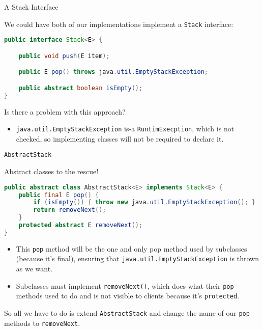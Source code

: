 \documentclass{beamer}
\begin{document}
\begin{frame}[fragile]{A Stack Interface}


We could have both of our implementations implement a {\tt Stack} interface:
\begin{lstlisting}[language=Java]
public interface Stack<E> {

    public void push(E item);

    public E pop() throws java.util.EmptyStackException;

    public abstract boolean isEmpty();
}
\end{lstlisting}
Is there a problem with this approach?
\begin{itemize}
\item<2> {\tt java.util.EmptyStackException} is-a {\tt RuntimExecption}, which is not checked, so implementing classes will not be required to declare it.
\end{itemize}


\end{frame}

\begin{frame}[fragile]{{\tt AbstractStack}}


Abstract classes to the rescue!
\begin{lstlisting}[language=Java]
public abstract class AbstractStack<E> implements Stack<E> {
    public final E pop() {
        if (isEmpty()) { throw new java.util.EmptyStackException(); }
        return removeNext();
    }
    protected abstract E removeNext();
}
\end{lstlisting}

\begin{itemize}
\item This {\tt pop} method will be the one and only pop method used by subclasses (because it's final), ensuring that {\tt java.util.EmptyStackException} is thrown as we want.
\item Subclasses must implement {\tt removeNext()}, which does what their {\tt pop} methods used to do and is not visible to clients because it's {\tt protected}.
\end{itemize}

So all we have to do is extend {\tt AbstractStack} and change the name of our {\tt pop} methods to {\tt removeNext}.

\end{frame}
\end{document}
